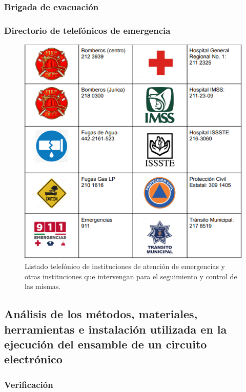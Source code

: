     \subsubsection{Brigada de evacuación}
    
    \subsubsection{Directorio de telefónicos de emergencia}
    
    \begin{figure}[H]
        \centering
        \includegraphics[scale=0.5]{35/Img/directorio.png}
        \caption{Listado telefónico de instituciones de atención de emergencias y otras instituciones que intervengan para el seguimiento y control de las mismas.}
    \end{figure}
    
    \subsection{Análisis de los métodos, materiales, herramientas e instalación utilizada en la ejecución del ensamble de un circuito electrónico}
    
    \subsubsection{Verificación}
    
